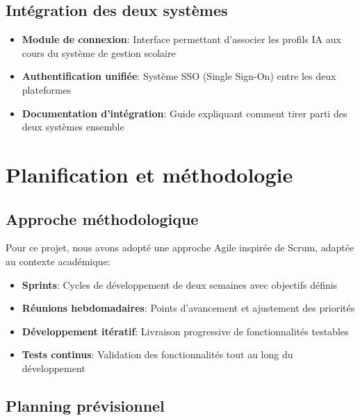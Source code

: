 \subsection{Intégration des deux systèmes}

\begin{itemize}
  \item \textbf{Module de connexion}: Interface permettant d'associer les profils IA aux cours du système de gestion scolaire
  
  \item \textbf{Authentification unifiée}: Système SSO (Single Sign-On) entre les deux plateformes
  
  \item \textbf{Documentation d'intégration}: Guide expliquant comment tirer parti des deux systèmes ensemble
\end{itemize}

\section{Planification et méthodologie}

\subsection{Approche méthodologique}

Pour ce projet, nous avons adopté une approche Agile inspirée de Scrum, adaptée au contexte académique:

\begin{itemize}
  \item \textbf{Sprints}: Cycles de développement de deux semaines avec objectifs définis
  
  \item \textbf{Réunions hebdomadaires}: Points d'avancement et ajustement des priorités
  
  \item \textbf{Développement itératif}: Livraison progressive de fonctionnalités testables
  
  \item \textbf{Tests continus}: Validation des fonctionnalités tout au long du développement
\end{itemize}

\subsection{Planning prévisionnel}


